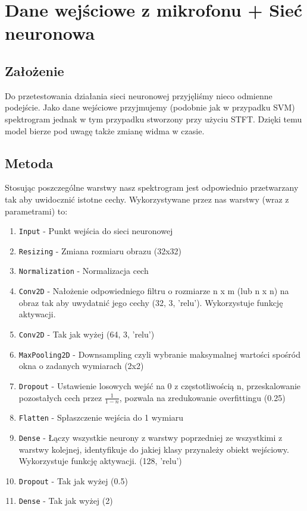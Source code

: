 \documentclass[polish]{article}
\begin{document}
\section{Dane wejściowe z mikrofonu + Sieć neuronowa}
\subsection{Założenie}
Do przetestowania działania sieci neuronowej przyjęliśmy nieco odmienne podejście. Jako dane wejściowe przyjmujemy (podobnie jak w przypadku SVM) spektrogram jednak w tym przypadku stworzony przy użyciu STFT. Dzięki temu model bierze pod uwagę także zmianę widma w czasie.
\subsection{Metoda}
Stosując poszczególne warstwy nasz spektrogram jest odpowiednio przetwarzany tak aby uwidocznić istotne cechy. Wykorzystywane przez nas warstwy (wraz z parametrami) to:
\begin{enumerate}
  \item\texttt{Input} - Punkt wejścia do sieci neuronowej
  \item\texttt{Resizing} - Zmiana rozmiaru obrazu (32x32)
  \item\texttt{Normalization} - Normalizacja cech
  \item\texttt{Conv2D} - Nałożenie odpowiedniego filtru o rozmiarze n x m (lub n x n) na obraz tak aby uwydatnić jego cechy (32, 3, 'relu'). Wykorzystuje funkcję aktywacji.
  \item\texttt{Conv2D} - Tak jak wyżej (64, 3, 'relu')
  \item\texttt{MaxPooling2D} - Downsampling czyli wybranie maksymalnej wartości spośród okna o zadanych wymiarach (2x2)
  \item\texttt{Dropout} - Ustawienie losowych wejść na 0 z częstotliwością n, przeskalowanie pozostałych cech przez 
  $\frac{1}{1-n}$, pozwala na zredukowanie overfittingu (0.25)
  \item\texttt{Flatten} - Spłaszczenie wejścia do 1 wymiaru
  \item\texttt{Dense} - Łączy wszystkie neurony z warstwy poprzedniej ze wszystkimi z warstwy kolejnej, identyfikuje do jakiej klasy przynależy obiekt wejściowy. Wykorzystuje funkcję aktywacji. (128, 'relu')
  \item\texttt{Dropout} - Tak jak wyżej (0.5)
  \item\texttt{Dense} - Tak jak wyżej (2)
\end{enumerate}
\end{document}

